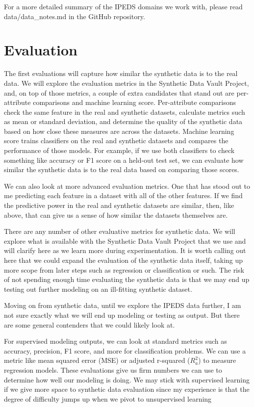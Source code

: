 \documentclass[sigconf, authorversion, nonacm]{acmart}
\begin{document}
            For a more detailed summary of the IPEDS domains we work with, please read data/data\_notes.md in the GitHub repository.

\section{Evaluation}
    The first evaluations will capture how similar the synthetic data is to the real data. We will explore the evaluation metrics in the Synthetic Data Vault Project, and, on top of those metrics, a couple of extra candidates that stand out are per-attribute comparisons and machine learning score. Per-attribute comparisons check the same feature in the real and synthetic datasets, calculate metrics such as mean or standard deviation, and determine the quality of the synthetic data based on how close these measures are across the datasets. Machine learning score trains classifiers on the real and synthetic datasets and compares the performance of those models. For example, if we use both classifiers to check something like accuracy or F1 score on a held-out test set, we can evaluate how similar the synthetic data is to the real data based on comparing those scores.

    We can also look at more advanced evaluation metrics. One that has stood out to me predicting each feature in a dataset with all of the other features. If we find the predictive power in the real and synthetic datasets are similar, then, like above, that can give us a sense of how similar the datasets themselves are.

    There are any number of other evaluative metrics for synthetic data. We will explore what is available with the Synthetic Data Vault Project that we use and will clarify here as we learn more during experimentation. It is worth calling out here that we could expand the evaluation of the synthetic data itself, taking up more scope from later steps such as regression or classification or such. The risk of not spending enough time evaluating the synthetic data is that we may end up testing out further modeling on an ill-fitting synthetic dataset.

    Moving on from synthetic data, until we explore the IPEDS data further, I am not sure exactly what we will end up modeling or testing as output. But there are some general contenders that we could likely look at.

    For supervised modeling outputs, we can look at standard metrics such as accuracy, precision, F1 score, and more for classification problems. We can use a metric like mean squared error (MSE) or adjusted r-squared ($R^2_a$) to measure regression models. These evaluations give us firm numbers we can use to determine how well our modeling is doing. We may stick with supervised learning if we give more space to synthetic data evaluation since my experience is that the degree of difficulty jumps up when we pivot to unsupervised learning
\end{document}
